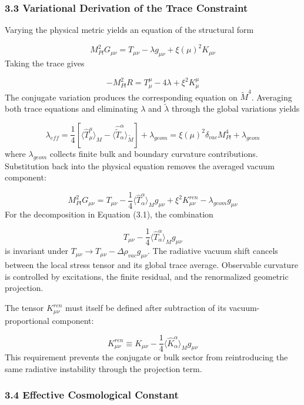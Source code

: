 \documentclass[aps,prd,onecolumn,superscriptaddress,nofootinbib,longbibliography,10pt]{revtex4-2}
\begin{document}
  
\subsubsection*{3.3 Variational Derivation of the Trace Constraint}

  Varying the physical metric yields an equation of the structural form


  \[ M_{Pl}^2 G_{\mu\nu} = T_{\mu\nu} - \lambda g_{\mu\nu} + \xi(\mu)^2 K_{\mu\nu} \]
  Taking the trace gives


  \[ -M_{Pl}^2 R = T^\mu_\mu - 4\lambda + \xi^2 K^\mu_\mu \]
  The conjugate variation produces the corresponding equation on \(\tilde{M}^4\). Averaging both trace equations and eliminating \(\lambda\) and \(\tilde{\lambda}\) through the global variations yields


  \[ \lambda_{eff} = \frac{1}{4}\left[ \langle \hat{T}^\mu_\mu \rangle_M - \langle \hat{\tilde{T}}^\alpha_\alpha \rangle_{\tilde{M}} \right] + \lambda_{geom} = \xi(\mu)^2 \delta_{vac} M_{Pl}^4 + \lambda_{geom} \]
  where \(\lambda_{geom}\) collects finite bulk and boundary curvature contributions. Substitution back into the physical equation removes the averaged vacuum component:


  \[ M_{Pl}^2 G_{\mu\nu} = T_{\mu\nu} - \frac{1}{4}\langle \hat{T}^\alpha_\alpha \rangle_M g_{\mu\nu} + \xi^2 K^{ren}_{\mu\nu} - \lambda_{geom} g_{\mu\nu} \]
  For the decomposition in Equation (3.1), the combination


  \[ T_{\mu\nu} - \frac{1}{4}\langle \hat{T}^\alpha_\alpha \rangle_M g_{\mu\nu} \]
  is invariant under \(T_{\mu\nu} \to T_{\mu\nu} - \Delta\rho_{vac} g_{\mu\nu}\). The radiative vacuum shift cancels between the local stress tensor and its global trace average. Observable curvature is controlled by excitations, the finite residual, and the renormalized geometric projection.


  The tensor \(K^{ren}_{\mu\nu}\) must itself be defined after subtraction of its vacuum-proportional component:


  \[ K^{ren}_{\mu\nu} \equiv K_{\mu\nu} - \frac{1}{4}\langle \hat{K}^\alpha_\alpha \rangle_M g_{\mu\nu} \]
  This requirement prevents the conjugate or bulk sector from reintroducing the same radiative instability through the projection term.



  
\subsubsection*{3.4 Effective Cosmological Constant}
\end{document}
